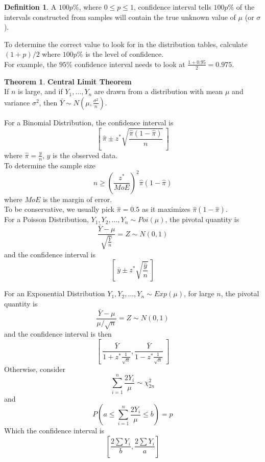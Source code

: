 \documentclass[12pt]{article}
\theoremstyle{definition}
\newtheorem*{defn}{Definition}
\newtheorem*{theorem}{Theorem}
\begin{document}
  \begin{defn}
    A $100p\%$, where $0 \leq p \leq 1$, confidence interval tells $100p\%$ of the intervals constructed from samples will contain the true unknown value of $\mu$ (or $\sigma$).
  \end{defn}

  To determine the correct value to look for in the distribution tables, calculate $(1+p)/2$ where $100p\%$ is the level of confidence. \\
  For example, the $95\%$ confidence interval needs to look at $\frac{1+0.95}{2} = 0.975$.

  \begin{theorem}
  \textbf{Central Limit Theorem} \\
    If $n$ is large, and if $Y_{1}, \dots, Y_{n}$ are drawn from a distribution with mean $\mu$ and variance $\sigma^{2}$, then $\bar{Y} \sim N\left(\mu, \frac{\sigma^{2}}{n}\right)$.
  \end{theorem}

  For a Binomial Distribution, the confidence interval is
  $$\left[~\hat{\pi} \pm z^{*}\sqrt{\frac{\hat{\pi}(1 - \hat{\pi})}{n}}~\right]$$
  where $\hat{\pi} = \frac{y}{n}$, $y$ is the observed data. \\
  To determine the sample size
  $$n \geq \left(\frac{z^{*}}{MoE}\right)^{2}\hat{\pi}(1 - \hat{\pi})$$
  where $MoE$ is the margin of error. \\
  To be conservative, we usually pick $\hat{\pi} = 0.5$ as it maximizes $\hat{\pi}(1 - \hat{\pi})$. \\

  For a Poisson Distribution, $Y_1, Y_2, \dots, Y_n \sim Poi(\mu)$, the pivotal quantity is
  $$\frac{\bar{Y} - \mu}{\sqrt{\frac{\bar{Y}}{n}}} = Z \sim N(0,1)$$
  and the confidence interval is
  $$\left[~\bar{y} \pm z^{*}\sqrt{\frac{\bar{y}}{n}}~\right]$$

  For an Exponential Distribution $Y_1, Y_2, \dots, Y_n \sim Exp(\mu)$, for large $n$, the pivotal quantity is
  $$\frac{\bar{Y} - \mu}{\mu / \sqrt{n}} = Z \sim N(0, 1)$$
  and the confidence interval is then
  $$\left[~ \frac{\bar{Y}}{1 + z^{*}\frac{1}{\sqrt{n}}}, \frac{\bar{Y}}{1 - z^{*}\frac{1}{\sqrt{n}}} ~\right]$$
  Otherwise, consider
  $$\sum_{i=1}^{n}\frac{2Y_{i}}{\mu} \sim \chi_{2n}^{2}$$
  and
  $$P\left(a \leq \sum_{i=1}^{n}\frac{2Y_{i}}{\mu} \leq b\right) = p$$
  Which the confidence interval is
  $$\left[\frac{2\sum Y_{i}}{b}, \frac{2\sum Y_{i}}{a}\right]$$
\end{document}

